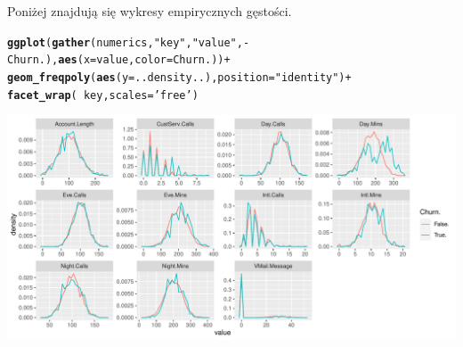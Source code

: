 \documentclass{article}\usepackage[]{graphicx}\usepackage[]{color}
\makeatletter
\def\maxwidth{ %
  \ifdim\Gin@nat@width>\linewidth
    \linewidth
  \else
    \Gin@nat@width
  \fi
}
\newcommand{\hlstr}[1]{\textcolor[rgb]{0.192,0.494,0.8}{#1}}%
\newcommand{\hlopt}[1]{\textcolor[rgb]{0,0,0}{#1}}%
\newcommand{\hlstd}[1]{\textcolor[rgb]{0.345,0.345,0.345}{#1}}%
\newcommand{\hlkwc}[1]{\textcolor[rgb]{0.333,0.667,0.333}{#1}}%
\newcommand{\hlkwd}[1]{\textcolor[rgb]{0.737,0.353,0.396}{\textbf{#1}}}%
\newenvironment{kframe}{%
 \def\at@end@of@kframe{}%
 \ifinner\ifhmode%
  \def\at@end@of@kframe{\end{minipage}}%
  \begin{minipage}{\columnwidth}%
 \fi\fi%
 \def\FrameCommand##1{\hskip\@totalleftmargin \hskip-\fboxsep
 \colorbox{shadecolor}{##1}\hskip-\fboxsep
     \hskip-\linewidth \hskip-\@totalleftmargin \hskip\columnwidth}%
 \MakeFramed {\advance\hsize-\width
   \@totalleftmargin\z@ \linewidth\hsize
   \@setminipage}}%
 {\par\unskip\endMakeFramed%
 \at@end@of@kframe}
\newenvironment{knitrout}{}{} %
\makeatother
\begin{document}
Poniżej znajdują się wykresy empirycznych gęstości.
\begin{knitrout}
\color{fgcolor}\begin{kframe}
\begin{alltt}
\hlkwd{ggplot}\hlstd{(}\hlkwd{gather}\hlstd{(numerics,} \hlstr{"key"}\hlstd{,} \hlstr{"value"}\hlstd{,} \hlopt{-}\hlstd{Churn.),} \hlkwd{aes}\hlstd{(}\hlkwc{x}\hlstd{=value,} \hlkwc{color}\hlstd{=Churn.))} \hlopt{+}
  \hlkwd{geom_freqpoly}\hlstd{(}\hlkwd{aes}\hlstd{(}\hlkwc{y}\hlstd{=..density..),} \hlkwc{position}\hlstd{=}\hlstr{"identity"}\hlstd{)} \hlopt{+}
  \hlkwd{facet_wrap}\hlstd{(}\hlopt{~}\hlstd{key,} \hlkwc{scales}\hlstd{=}\hlstr{'free'}\hlstd{)}
\end{alltt}
\end{kframe}

{\centering \includegraphics[width=\maxwidth]{figure/Wykresy_gestosci-1} 

}



\end{knitrout}
\end{document}
